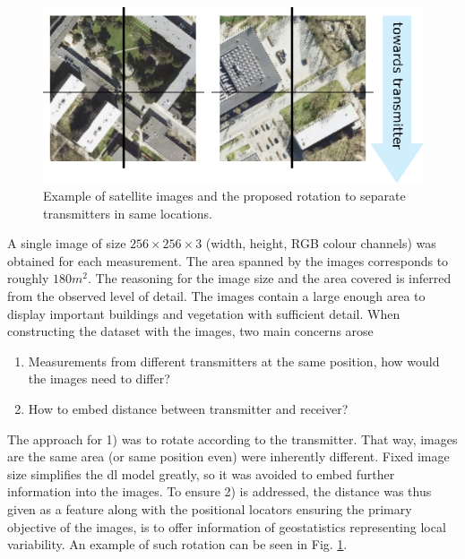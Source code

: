 \begin{figure}[h]
    \centering
    \includegraphics{chapters/part_pathloss/figures/satellite_example.eps}
    \caption{Example of satellite images and the proposed rotation to separate transmitters in same locations.}
    \label{fig:satellite_example}
\end{figure}
A single image of size $256 \times 256 \times 3$ (width, height, RGB colour channels) was obtained for each measurement. The area spanned by the images corresponds to roughly $180 m^2$. The reasoning for the image size and the area covered is inferred from the observed level of detail. The images contain a large enough area to display important buildings and vegetation with sufficient detail. When constructing the dataset with the images, two main concerns arose
\begin{enumerate}

    \item Measurements from different transmitters at the same position, how would the images need to differ?
    \item How to embed distance between transmitter and receiver?
\end{enumerate}

The approach for 1) was to rotate according to the transmitter. That way, images are the same area (or same position even) were inherently different. Fixed image size simplifies the \gls{dl} model greatly, so it was avoided to embed further information into the images. To ensure 2) is addressed, the distance was thus given as a feature along with the positional locators ensuring the primary objective of the images, is to offer information of geostatistics representing local variability. An example of such rotation can be seen in Fig. \ref{fig:satellite_example}.





